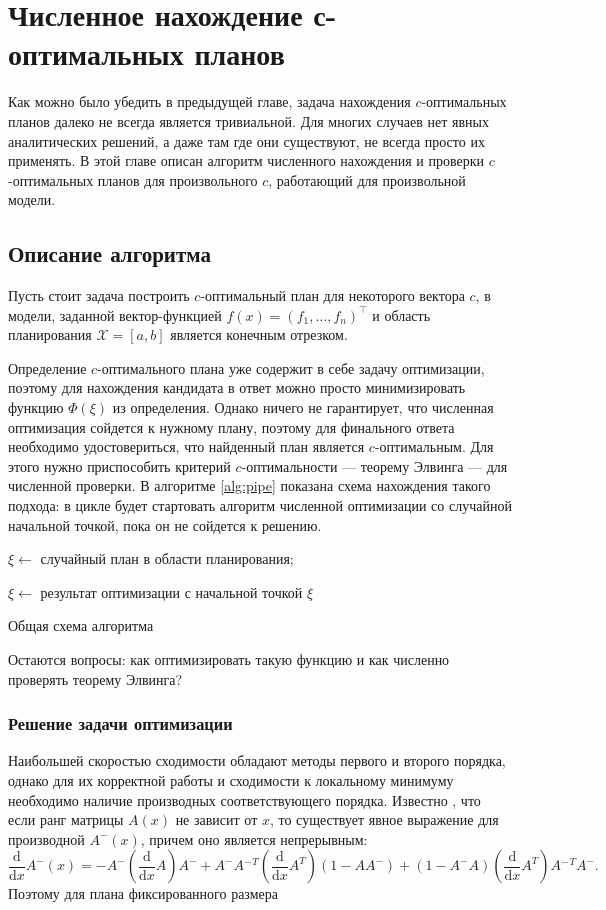 \documentclass[specialist,
               substylefile = spbu.rtx,
               subf,href,colorlinks=true, 12pt]{disser}
\theoremstyle{definition}
\begin{document}
	
\chapter{Численное нахождение с-оптимальных планов}
	Как можно было убедить в предыдущей главе, задача нахождения $c$-оптимальных планов далеко не всегда является тривиальной. Для многих случаев нет явных аналитических решений, а даже там где они существуют, не всегда просто их применять. В этой главе описан алгоритм численного нахождения и проверки $c$-оптимальных планов для произвольного $c$, работающий для произвольной модели.
	\section{Описание алгоритма}
	Пусть стоит задача построить $c$-оптимальный план для некоторого вектора $c$, в модели, заданной вектор-функцией $f(x) = (f_1, \ldots, f_n)^\top$ и область планирования $\mathcal{X} = [a, b]$ является конечным отрезком.
	
	Определение $c$-оптимального плана уже содержит в себе задачу оптимизации, поэтому для нахождения кандидата в ответ можно просто минимизировать функцию $\Phi(\xi)$ из определения. Однако ничего не гарантирует, что численная оптимизация сойдется к нужному плану, поэтому для финального ответа необходимо удостовериться, что  найденный план является $c$-оптимальным. Для этого нужно приспособить критерий $c$-оптимальности --- теорему Элвинга --- для численной проверки. В алгоритме \ref{alg:pipe} показана схема нахождения такого подхода: в цикле будет стартовать алгоритм численной оптимизации со случайной начальной точкой, пока он не сойдется к решению.
	
	\begin{algorithm}[H]
		\SetAlgoLined 
		\KwResult{$\xi$} 
		 {
			$\xi \leftarrow$ случайный план в области планирования;
			
			$\xi \leftarrow$ результат оптимизации с начальной точкой $\xi$
		}
		\caption{Общая схема алгоритма}
		\label{alg:pipe}
	\end{algorithm}
	
	Остаются вопросы: как оптимизировать такую функцию и как численно проверять теорему Элвинга?
	\subsection{Решение задачи оптимизации}
	Наибольшей скоростью сходимости обладают методы первого и второго порядка, однако для их корректной работы и сходимости к локальному минимуму необходимо наличие производных соответствующего порядка. 
	Известно \cite{pinv_der}, что если ранг матрицы $A(x)$ не зависит от $x$, то существует явное выражение для производной $A^-(x)$, причем оно является непрерывным:
	\begin{equation*}
		\frac{\mathrm d}{\mathrm d x} A^-(x) =
 -A^- \left( \frac{\mathrm d}{\mathrm d x} A \right) A^-
+A^- A{^-}^T  \left( \frac{\mathrm d}{\mathrm d x} A^T \right) (1-A A^-)
+ (1-A^- A) \left( \frac{\mathrm d}{\mathrm d x} A^T \right) A{^-}^T A^-.
	\end{equation*}
	Поэтому для плана фиксированного размера 
\end{document}
